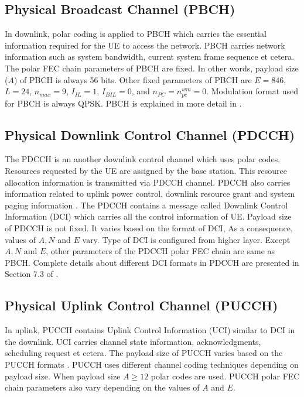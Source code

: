 \subsection{Physical Broadcast Channel (PBCH)}
In downlink, polar coding is applied to PBCH which carries the essential information required for the UE to access the network. PBCH carries network information such as system bandwidth, current system frame sequence et cetera. The polar FEC chain parameters of PBCH are fixed. In other words, payload size ($A$) of PBCH is always 56 bits. Other fixed parameters of PBCH are $E = 846$, $L = 24$, $n_{max} = 9$, $I_{IL} = 1$, $I_{BIL} = 0$, and $n_{PC} = n_{pc}^{wm} = 0$. Modulation format used for PBCH is always QPSK. PBCH is explained in more detail in \cite{3gpp.38.212}.

\subsection{Physical Downlink Control Channel (PDCCH)}
The PDCCH is an another downlink control channel which uses polar codes. Resources requested by the UE are assigned by the base station. This resource allocation information is transmitted via PDCCH channel. PDCCH also carries information related to uplink power control, downlink resource grant and system paging information \cite{3gpp.38.211}. The PDCCH contains a message called Downlink Control Information (DCI) which carries all the control information of UE. Payload size of PDCCH is not fixed. It varies based on the format of DCI, As a consequence, values of $A, N$ and $E$ vary. Type of DCI is configured from higher layer. Except $A, N$ and $E$, other parameters of the PDCCH polar FEC chain are same as PBCH. Complete details about different DCI formats in PDCCH are presented in Section 7.3 of \cite{3gpp.38.212}.

\subsection{Physical Uplink Control Channel (PUCCH)}
In uplink, PUCCH contains Uplink Control Information (UCI) similar to DCI in the downlink. UCI carries channel state information, acknowledgments, scheduling request et cetera. The payload size of PUCCH varies based on the PUCCH formats \cite{3gpp.38.211}. PUCCH uses different channel coding techniques depending on payload size. When payload size $A \geq 12$ polar codes are used. PUCCH polar FEC chain parameters also vary depending on the values of $A$ and $E$. \newline

